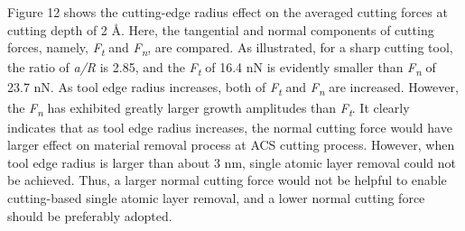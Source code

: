\documentclass{article}
\begin{document}
Figure 12 shows the cutting-edge radius effect on the averaged cutting forces at cutting depth of 2 Å. Here, the tangential and normal components of cutting forces, namely, \emph{F}\textsubscript{\emph{t}} and \emph{F}\textsubscript{\emph{n}}, are compared. As illustrated, for a sharp cutting tool, the ratio of \emph{a/R} is 2.85, and the \emph{F}\textsubscript{\emph{t}} of 16.4 nN is evidently smaller than \emph{F}\textsubscript{\emph{n}} of 23.7 nN. As tool edge radius increases, both of \emph{F}\textsubscript{\emph{t}} and \emph{F}\textsubscript{\emph{n}} are increased. However, the \emph{F}\textsubscript{\emph{n}} has exhibited greatly larger growth amplitudes than \emph{F}\textsubscript{\emph{t}}. It clearly indicates that as tool edge radius increases, the normal cutting force would have larger effect on material removal process at ACS cutting process. However, when tool edge radius is larger than about 3 nm, single atomic layer removal could not be achieved. Thus, a larger normal cutting force would not be helpful to enable cutting-based single atomic layer removal, and a lower normal cutting force should be preferably adopted.
\end{document}
